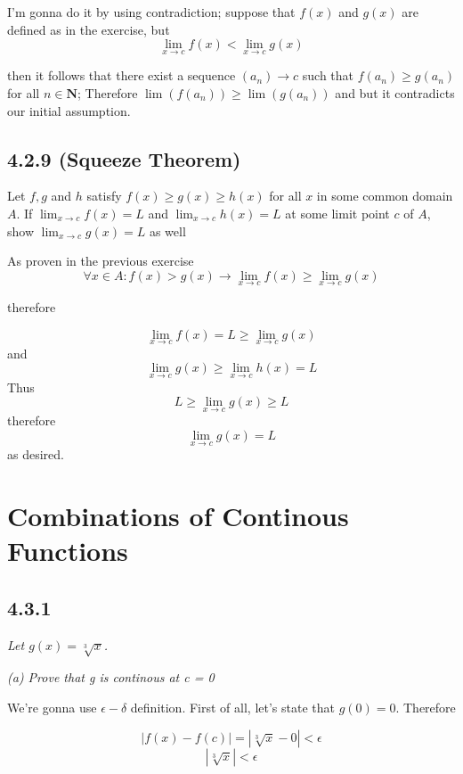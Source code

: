 \documentclass[11pt,oneside,titlepage]{book}
\begin{document}
I'm gonna do it by using contradiction; suppose that $f(x)$ and $g(x)$ are defined as in the
exercise, but
$$\lim_{x \to c} f(x) <  \lim_{x \to c} g(x) $$






then it follows that there exist a sequence $(a_n) \to c$ such that $f(a_n) \geq g(a_n)$ for all
$n \in \textbf{N}$; Therefore $\lim(f(a_n)) \geq \lim(g(a_n))$ and  but it contradicts our
initial assumption.

\subsection*{4.2.9 (Squeeze Theorem)} Let $f,g$ and $h$ satisfy $f(x) \geq g(x) \geq h(x)$ for all
$x$ in some common domain $A$. If $\lim_{x \to c}f(x) = L$ and $\lim_{x \to c}h(x) = L$ at some
limit point $c$ of  $A$, show $\lim_{x \to c}g(x) = L$ as well

As proven in the previous exercise
$$\forall x \in A: f(x) > g(x) \to \lim_{x \to c} f(x) \geq \lim_{x \to c} g(x) $$

therefore

$$\lim_{x \to c} f(x) = L \geq \lim_{x \to c} g(x) $$
and
$$\lim_{x \to c} g(x) \geq \lim_{x \to c} h(x) = L $$
Thus 
$$ L \geq\lim_{x \to c} g(x) \geq L  $$
therefore
$$\lim_{x \to c} g(x) = L  $$
as desired.

\section{Combinations of Continous Functions}

\subsection*{4.3.1}
\textit{Let $g(x) = \sqrt[3]{x}$.}

\textit{(a) Prove that g is continous at c = 0}

We're gonna use $\epsilon-\delta$ definition. First of all, let's state that $g(0) = 0$. Therefore

$$|f(x) - f(c)| = |\sqrt[3]{x} - 0|  < \epsilon $$
$$ |\sqrt[3]{x}| < \epsilon $$
\end{document}
